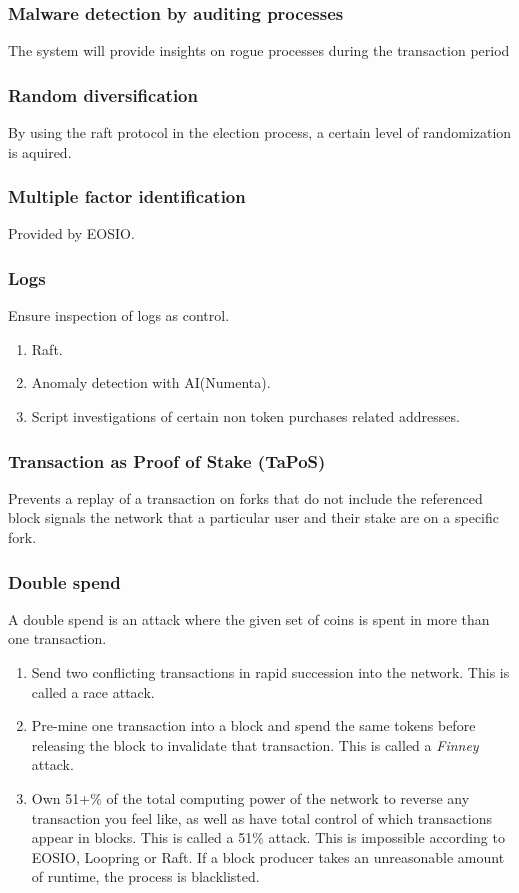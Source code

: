 \documentclass[]{article}
\begin{document}
		\subsubsection{Malware detection by auditing processes}
		The system will provide insights on rogue processes during the transaction period 
		\subsubsection{Random diversification}
		By using the raft protocol in the election process, a certain level of randomization is aquired.
		\subsubsection{Multiple factor identification}
		Provided by EOSIO.
		\subsubsection {Logs}
			Ensure inspection of logs as control.
			\begin{enumerate}
				\item Raft.
				\item Anomaly detection with AI(Numenta).
				\item Script investigations of certain non token purchases related addresses.
			\end{enumerate}
		\subsubsection{Transaction as Proof of Stake (TaPoS)}
			Prevents a replay of a transaction on forks that do not include the referenced block signals the network that a particular user and their stake are on a specific fork.
		\subsubsection{Double spend}
		A double spend is an attack where the given set of coins is spent in more than one transaction.
		\begin{enumerate}
			\item Send two conflicting transactions in rapid succession into the network. This is called a race attack. 
			\item Pre-mine one transaction into a block and spend the same tokens before releasing the block to invalidate that transaction. This is called a \textit{Finney} attack.
			\item Own 51+\% of the total computing power of the network to reverse any transaction you feel like, as well as have total control of which transactions appear in blocks. This is called a 51\% attack.
			This is impossible according to EOSIO, Loopring or Raft.
			If a block producer takes an unreasonable amount of runtime, the process is blacklisted.
			  
		\end{enumerate} 
\end{document}
